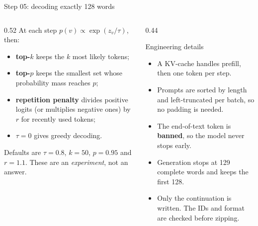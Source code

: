 \documentclass[aspectratio=169,11pt]{beamer}
\begin{document}
\begin{frame}{Step 05: decoding exactly 128 words}
  \begin{columns}[T]
    \begin{column}{0.52\textwidth}
      \small
      At each step $p(v)\propto \exp(z_v/\tau)$, then:
      \begin{itemize}
        \item \textbf{top-$k$} keeps the $k$ most likely tokens;
        \item \textbf{top-$p$} keeps the smallest set whose probability mass reaches $p$;
        \item \textbf{repetition penalty} divides positive logits (or multiplies negative ones) by $r$ for recently used tokens;
        \item $\tau=0$ gives greedy decoding.
      \end{itemize}
      \vspace{1mm}
      Defaults are $\tau=0.8$, $k=50$, $p=0.95$ and $r=1.1$. These are an \emph{experiment}, not an answer.
    \end{column}
    \begin{column}{0.44\textwidth}
      \begin{block}{Engineering details}
        \small
        \begin{itemize}
          \item A KV-cache handles prefill, then one token per step.
          \item Prompts are sorted by length and left-truncated per batch, so no padding is needed.
          \item The end-of-text token is \textbf{banned}, so the model never stops early.
          \item Generation stops at 129 complete words and keeps the first 128.
          \item Only the continuation is written. The IDs and format are checked before zipping.
        \end{itemize}
      \end{block}
    \end{column}
  \end{columns}
\end{frame}
\end{document}
